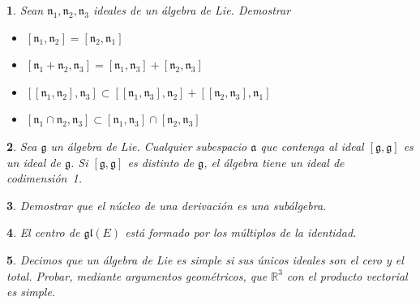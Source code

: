 \documentclass[a4paper,draft,12pt]{scrartcl}
\newtheorem{pro1}{}%
\newenvironment{pro}{\begin{pro1} \rm} {\end{pro1}}
\newcommand{\R}{\mathbb{R}}%
\newcommand{\g}{\mathfrak{g}}%
\begin{document}
\begin{pro}

Sean $\mathfrak{n_1}, \mathfrak{n_2}, \mathfrak{n_3}$ ideales de un álgebra de Lie.  Demostrar

\begin{itemize}

\item $ [\mathfrak{n_1}, \mathfrak{n_2}]= [\mathfrak{n_2}, \mathfrak{n_1}]$

\item $ [\mathfrak{n_1}+ \mathfrak{n_2}, \mathfrak{n_3}]= [\mathfrak{n_1}, \mathfrak{n_3}]+ [\mathfrak{n_2}, \mathfrak{n_3}]$

\item $[[\mathfrak{n_1}, \mathfrak{n_2}],\mathfrak{n_3}] \subset [[\mathfrak{n_1}, \mathfrak{n_3}],\mathfrak{n_2}]+[[\mathfrak{n_2},\mathfrak{n_3}],\mathfrak{n_1}]$

\item $[ \mathfrak{n_1} \cap \mathfrak{n_2}, \mathfrak{n_3}] \subset [\mathfrak{n_1}, \mathfrak{n_3}] \cap [\mathfrak{n_2}, \mathfrak{n_3}]$

\end{itemize}

\end{pro}

\begin{pro}

Sea $\g$ un álgebra de Lie.  Cualquier subespacio $\mathfrak{a}$ que contenga al ideal $[\g,\g]$ es un ideal de $\g$. Si $[\g,\g]$ es distinto de $\g$, el álgebra tiene un ideal de codimensión~1.

\end{pro}





\begin{pro}

Demostrar que el núcleo de una derivación es una subálgebra.

\end{pro}
  

\begin{pro}

El centro de $\mathfrak{gl}(E)$ está formado por los múltiplos de la identidad.

\end{pro}

\begin{pro}

Decimos que un álgebra de Lie es simple si sus únicos ideales son el cero y el total. Probar, mediante argumentos geométricos, que $\R^3$ con el producto vectorial es simple.

\end{pro}
\end{document}
